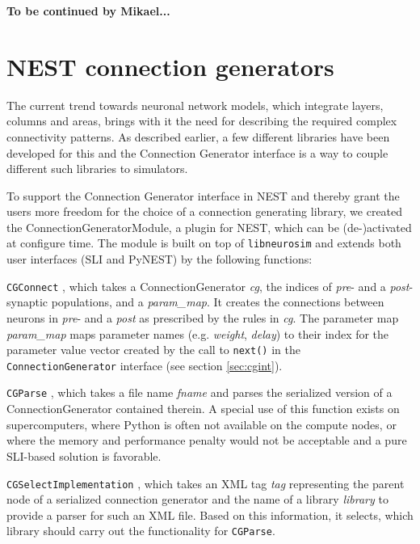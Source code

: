 \documentclass{frontiersSCNS} %
\newcommand{\tbw}[1]{{\bf\parindent0pt\color{red}#1}}
\begin{document}
\tbw{To be continued by Mikael...}

\section{NEST connection generators}\label{sec:conn_gen_nest}

The current trend towards neuronal network models, which integrate
layers, columns and areas, brings with it the need for describing the
required complex connectivity patterns. As described earlier, a few
different libraries have been developed for this and the Connection
Generator interface is a way to couple different such libraries to
simulators.

To support the Connection Generator interface in NEST and thereby
grant the users more freedom for the choice of a connection generating
library, we created the ConnectionGeneratorModule, a plugin for NEST,
which can be (de-)activated at configure time. The module is built on
top of \verb|libneurosim| and extends both user interfaces (SLI and
PyNEST) by the following functions:

\begin{unlist}
\item[\tt CGConnect], which takes a ConnectionGenerator \emph{cg}, the
  indices of \emph{pre}- and a \emph{post}-synaptic populations, and a
  \emph{param\_map}. It creates the connections between neurons in
  \emph{pre}- and a \emph{post} as prescribed by the rules in
  \emph{cg}. The parameter map \emph{param\_map} maps parameter names
  (e.g. \emph{weight}, \emph{delay}) to their index for the parameter
  value vector created by the call to \verb|next()| in the
  \verb|ConnectionGenerator| interface (see section \ref{sec:cgint}).
\item[\tt CGParse], which takes a file name \emph{fname} and parses
  the serialized version of a ConnectionGenerator contained therein. A
  special use of this function exists on supercomputers, where Python
  is often not available on the compute nodes, or where the memory and
  performance penalty would not be acceptable and a pure SLI-based
  solution is favorable.
\item[\tt CGSelectImplementation], which takes an XML tag \emph{tag}
  representing the parent node of a serialized connection generator
  and the name of a library \emph{library} to provide a parser for
  such an XML file. Based on this information, it selects, which
  library should carry out the functionality for \verb|CGParse|.
\end{unlist}
\end{document}
